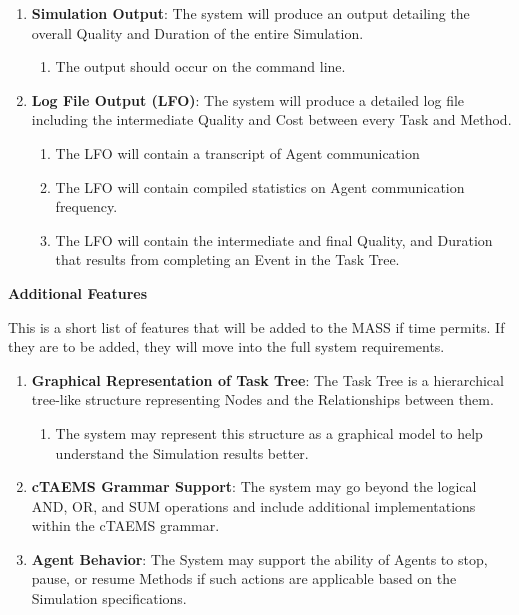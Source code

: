 \begin{enumerate}
  \item\textbf{Simulation Output}: The system will produce an output detailing the overall Quality and Duration of the entire Simulation.
  \begin{enumerate}
  \item The output should occur on the command line.
  \end{enumerate}
  
  \item\textbf{Log File Output (LFO)}: The system will produce a detailed log file including the intermediate Quality and Cost between every Task and Method.
  \begin{enumerate}
  \item The LFO will contain a transcript of Agent communication
  \item The LFO will contain compiled statistics on Agent communication frequency.
  \item The LFO will contain the intermediate and final Quality, and Duration that results from completing an Event in the Task Tree.
  \end{enumerate}

\end{enumerate}


\begin{center} \textbf{Additional Features} \end{center}

This is a short list of features that will be added to the MASS if time permits. If they are to be added, they will move into the full system requirements.

\begin{enumerate}

\item\textbf{Graphical Representation of Task Tree}:  The Task Tree is a hierarchical tree-like structure representing Nodes and the Relationships between them.
\begin{enumerate}
\item The system may represent this structure as a graphical model to help understand the Simulation results better. 
\end{enumerate}

\item\textbf{cTAEMS Grammar Support}: The system may go beyond the logical AND, OR, and SUM operations and include additional implementations within the cTAEMS grammar.

\item\textbf{Agent Behavior}: The System may support the ability of Agents to stop, pause, or resume Methods if such actions are applicable based on the Simulation specifications. 

\end{enumerate}
